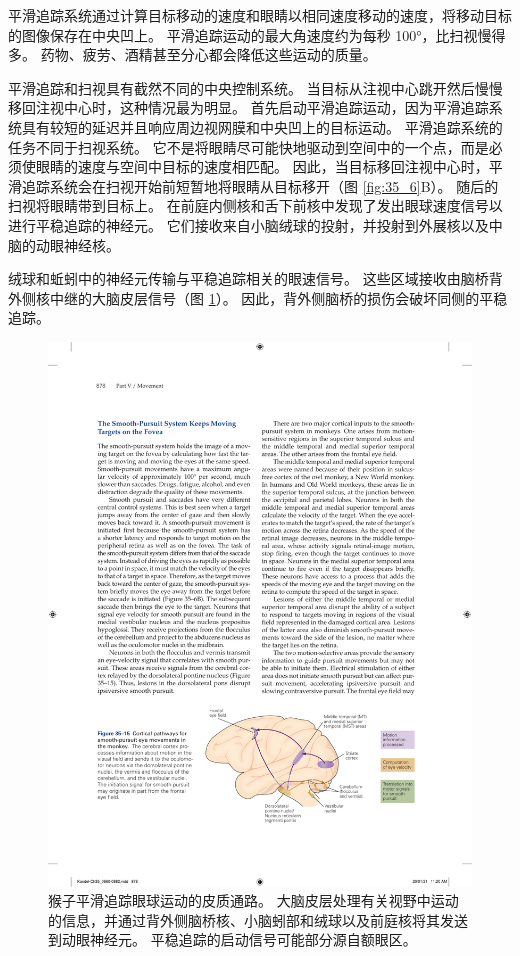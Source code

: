 平滑追踪系统通过计算目标移动的速度和眼睛以相同速度移动的速度，将移动目标的图像保存在中央凹上。 平滑追踪运动的最大角速度约为每秒 100°，比扫视慢得多。 药物、疲劳、酒精甚至分心都会降低这些运动的质量。

平滑追踪和扫视具有截然不同的中央控制系统。 当目标从注视中心跳开然后慢慢移回注视中心时，这种情况最为明显。 首先启动平滑追踪运动，因为平滑追踪系统具有较短的延迟并且响应周边视网膜和中央凹上的目标运动。 平滑追踪系统的任务不同于扫视系统。 它不是将眼睛尽可能快地驱动到空间中的一个点，而是必须使眼睛的速度与空间中目标的速度相匹配。 因此，当目标移回注视中心时，平滑追踪系统会在扫视开始前短暂地将眼睛从目标移开（图 \ref{fig:35_6}B）。 随后的扫视将眼睛带到目标上。 在前庭内侧核和舌下前核中发现了发出眼球速度信号以进行平稳追踪的神经元。 它们接收来自小脑绒球的投射，并投射到外展核以及中脑的动眼神经核。

绒球和蚯蚓中的神经元传输与平稳追踪相关的眼速信号。 
这些区域接收由脑桥背外侧核中继的大脑皮层信号（图 \ref{fig:35_15}）。
因此，背外侧脑桥的损伤会破坏同侧的平稳追踪。

\begin{figure}[htbp]
	\centering
	\includegraphics[width=0.7\linewidth]{chap35/fig_35_15}
	\caption{猴子平滑追踪眼球运动的皮质通路。 大脑皮层处理有关视野中运动的信息，并通过背外侧脑桥核、小脑蚓部和绒球以及前庭核将其发送到动眼神经元。 平稳追踪的启动信号可能部分源自额眼区。}
	\label{fig:35_15}
\end{figure}

